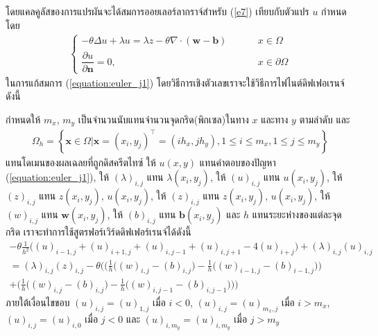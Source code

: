 \hspace{1cm}  โดยแคลคูลัสของการแปรผันจะได้สมการออยเลอร์ลากราจ์สำหรับ (\ref{e7}) เทียบกับตัวแปร $u$ กำหนดโดย
\begin{align}
\left \{ \begin{array}{ll}   - \theta \Delta u + \lambda u = \lambda z - \theta \nabla \cdot (\boldsymbol{w}-\boldsymbol{b}) & \hspace{1cm} x \in  \Omega 	 \\
 \dfrac{\partial u}{\partial \boldsymbol{n}} = 0, & \hspace{1cm} x \in \partial \Omega \end{array} \right . 
 \label{equation:euler_j1}
\end{align}
\hspace{1cm} ในการแก้สมการ (\ref{equation:euler_j1}) โดยวิธีการเชิงตัวเลขเราจะใช้วิธีการไฟไนต์ดิฟเฟอเรนจ์ดังนี้

\hspace{1cm} กำหนดให้ $m_x$, $m_y$ เป็นจำนวนนับแทนจำนวนจุดกริด(พิกเซล)ในทาง $x$ และทาง $y$ ตามลำดับ และ
\begin{align*}
	\Omega_{h}=\left\{ \mathbf{x} \in \Omega | \mathbf{x}=(x_i,y_j)^{\top} = (ih_x,jh_y), 1 \leq i \leq m_x, 1 \leq j \leq m_y  \right\}
\end{align*}
แทนโดเมนของผลเฉลยที่ถูกดิสครีตไทซ์ ให้ $u(x,y)$ แทนคำตอบของปัญหา  (\ref{equation:euler_j1}), ให้ $(\lambda)_{i,j}$ แทน $\lambda(x_i,y_j)$,   ให้ $(u)_{i,j}$ แทน $u(x_i,y_j)$, ให้ $(z)_{i,j}$ แทน $z(x_i,y_j)$, $u(x_i,y_j)$, ให้ $(z)_{i,j}$ แทน $z(x_i,y_j)$, $u(x_i,y_j)$, ให้ $(w)_{i,j}$ แทน $\boldsymbol{w}(x_i,y_j)$, ให้ $(b)_{i,j}$ แทน $\boldsymbol{b}(x_i,y_j)$ และ $h$ แทนระยะห่างของแต่ละจุดกริด เราจะทำการใช้สูตรฟอร์เวิร์ดดิฟเฟอร์เรนจ์ได้ดังนี้
\begin{align}
	\nonumber - \theta \frac{1}{h^2}\Big( (u)_{i-1,j} + (u)_{i+1,j} + (u)_{i,j-1} + (u)_{i,j+1} - 4(u)_{i+j} \Big) + (\lambda)_{i,j} (u)_{i,j} \\ \nonumber = (\lambda)_{i,j} (z)_{i,j} - \theta \Bigg( \bigg( \frac{1}{h} \Big((w)_{i,j}-(b)_{i,j}\Big) - \frac{1}{h} \Big((w)_{i-1,j}-(b)_{i-1,j}\Big) \bigg) \\ + \bigg( \frac{1}{h} \Big((w)_{i,j}-(b)_{i,j} \Big) - \frac{1}{h} \Big((w)_{i,j-1}-(b)_{i,j-1} \Big) \bigg) \Bigg)
\end{align}
ภายใต้เงื่อนไขขอบ $(u)_{i,j} = (u)_{1,j}$ เมื่อ $i < 0$, $(u)_{i,j} = (u)_{m_x,j}$ เมื่อ $i > m_x$, $(u)_{i,j} = (u)_{i,0}$ เมื่อ $j < 0$ และ $(u)_{i,m_y} = (u)_{i,m_y}$ เมื่อ $j > m_y$ 


